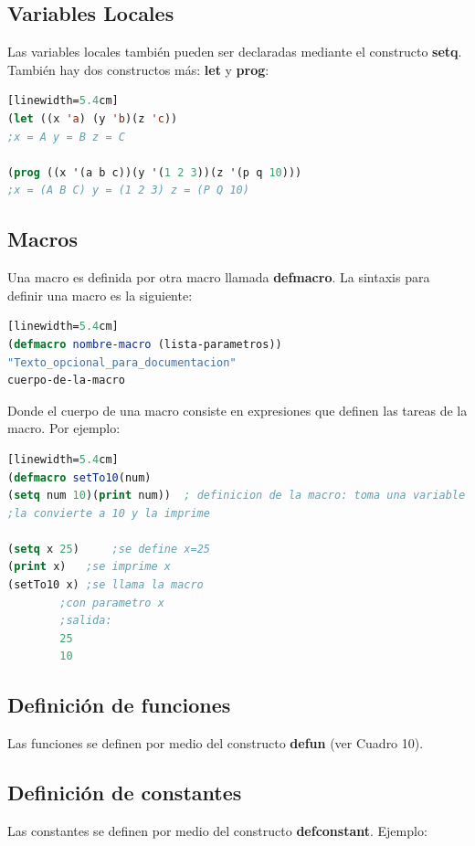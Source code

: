\documentclass[10pt,journal,compsoc]{IEEEtran}
\begin{document}
\subsection{Variables Locales}
Las variables locales tambi\'en pueden ser declaradas mediante el constructo \textbf{setq}. Tambi\'en hay dos constructos m\'as: \textbf{let} y \textbf{prog}:

\begin{lstlisting}[language=Lisp, caption = {Declaraci\'on de variables locales}][linewidth=5.4cm]
(let ((x 'a) (y 'b)(z 'c)) 
;x = A y = B z = C
 
(prog ((x '(a b c))(y '(1 2 3))(z '(p q 10))) 
;x = (A B C) y = (1 2 3) z = (P Q 10)
\end{lstlisting}

\subsection{Macros}
Una macro es definida por otra macro llamada \textbf{defmacro}. La sintaxis para definir una macro es la siguiente: 
\begin{lstlisting}[language=Lisp, caption = {Estructura de una macro}][linewidth=5.4cm]
(defmacro nombre-macro (lista-parametros))
"Texto_opcional_para_documentacion"
cuerpo-de-la-macro
\end{lstlisting}
Donde el cuerpo de una macro consiste en expresiones que definen las tareas de la macro. Por ejemplo: 

\begin{lstlisting}[language=Lisp, caption = {Ejemplo de una macro}][linewidth=5.4cm]
(defmacro setTo10(num) 
(setq num 10)(print num))  ; definicion de la macro: toma una variable
;la convierte a 10 y la imprime

(setq x 25) 	;se define x=25
(print x)	;se imprime x
(setTo10 x)	;se llama la macro 
		;con parametro x
		;salida: 
		25  
		10
\end{lstlisting}

\subsection{Definici\'on de funciones}
Las funciones se definen por medio del constructo \textbf{defun} (ver Cuadro 10).

\subsection{Definici\'on de constantes}
Las constantes se definen por medio del constructo \textbf{defconstant}. Ejemplo: 
\end{document}
